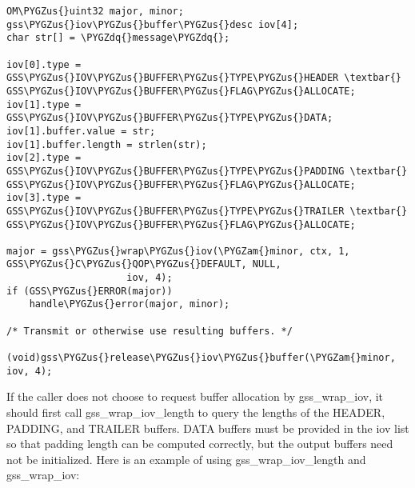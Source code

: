\documentclass[letterpaper,10pt,english]{sphinxmanual}
\def\PYGZus{\char`\_}
\def\PYGZam{\char`\&}
\def\PYGZdq{\char`\"}
\begin{document}
\begin{Verbatim}[commandchars=\\\{\}]
OM\PYGZus{}uint32 major, minor;
gss\PYGZus{}iov\PYGZus{}buffer\PYGZus{}desc iov[4];
char str[] = \PYGZdq{}message\PYGZdq{};

iov[0].type = GSS\PYGZus{}IOV\PYGZus{}BUFFER\PYGZus{}TYPE\PYGZus{}HEADER \textbar{} GSS\PYGZus{}IOV\PYGZus{}BUFFER\PYGZus{}FLAG\PYGZus{}ALLOCATE;
iov[1].type = GSS\PYGZus{}IOV\PYGZus{}BUFFER\PYGZus{}TYPE\PYGZus{}DATA;
iov[1].buffer.value = str;
iov[1].buffer.length = strlen(str);
iov[2].type = GSS\PYGZus{}IOV\PYGZus{}BUFFER\PYGZus{}TYPE\PYGZus{}PADDING \textbar{} GSS\PYGZus{}IOV\PYGZus{}BUFFER\PYGZus{}FLAG\PYGZus{}ALLOCATE;
iov[3].type = GSS\PYGZus{}IOV\PYGZus{}BUFFER\PYGZus{}TYPE\PYGZus{}TRAILER \textbar{} GSS\PYGZus{}IOV\PYGZus{}BUFFER\PYGZus{}FLAG\PYGZus{}ALLOCATE;

major = gss\PYGZus{}wrap\PYGZus{}iov(\PYGZam{}minor, ctx, 1, GSS\PYGZus{}C\PYGZus{}QOP\PYGZus{}DEFAULT, NULL,
                     iov, 4);
if (GSS\PYGZus{}ERROR(major))
    handle\PYGZus{}error(major, minor);

/* Transmit or otherwise use resulting buffers. */

(void)gss\PYGZus{}release\PYGZus{}iov\PYGZus{}buffer(\PYGZam{}minor, iov, 4);
\end{Verbatim}

If the caller does not choose to request buffer allocation by
gss\_wrap\_iov, it should first call gss\_wrap\_iov\_length to query the
lengths of the HEADER, PADDING, and TRAILER buffers.  DATA buffers
must be provided in the iov list so that padding length can be
computed correctly, but the output buffers need not be initialized.
Here is an example of using gss\_wrap\_iov\_length and gss\_wrap\_iov:
\end{document}

